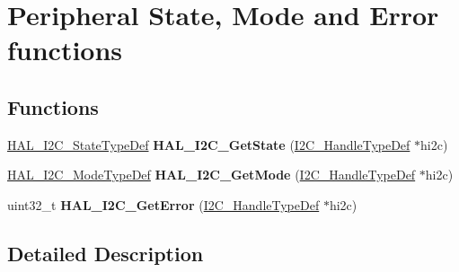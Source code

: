 \hypertarget{group___i2_c___exported___functions___group3}{}\section{Peripheral State, Mode and Error functions}
\label{group___i2_c___exported___functions___group3}
\subsection*{Functions}
\begin{DoxyCompactItemize}
\item 
\mbox{\label{group___i2_c___exported___functions___group3_gad63373b093502b83d5f9bd5e292385f0}} 
\mbox{\hyperlink{group___h_a_l__state__structure__definition_gaef355af8eab251ae2a19ee164ad81c37}{H\+A\+L\+\_\+\+I2\+C\+\_\+\+State\+Type\+Def}} {\bfseries H\+A\+L\+\_\+\+I2\+C\+\_\+\+Get\+State} (\mbox{\hyperlink{struct_____i2_c___handle_type_def}{I2\+C\+\_\+\+Handle\+Type\+Def}} $\ast$hi2c)
\item 
\mbox{\label{group___i2_c___exported___functions___group3_ga12d8407ccfb92f50caa5189b05a13351}} 
\mbox{\hyperlink{group___h_a_l__mode__structure__definition_gabcbb7b844f2ffd63c4e530c117882062}{H\+A\+L\+\_\+\+I2\+C\+\_\+\+Mode\+Type\+Def}} {\bfseries H\+A\+L\+\_\+\+I2\+C\+\_\+\+Get\+Mode} (\mbox{\hyperlink{struct_____i2_c___handle_type_def}{I2\+C\+\_\+\+Handle\+Type\+Def}} $\ast$hi2c)
\item 
\mbox{\label{group___i2_c___exported___functions___group3_ga5db5fcfa0c3fd3e45e176d000738f7bc}} 
uint32\+\_\+t {\bfseries H\+A\+L\+\_\+\+I2\+C\+\_\+\+Get\+Error} (\mbox{\hyperlink{struct_____i2_c___handle_type_def}{I2\+C\+\_\+\+Handle\+Type\+Def}} $\ast$hi2c)
\end{DoxyCompactItemize}


\subsection{Detailed Description}
